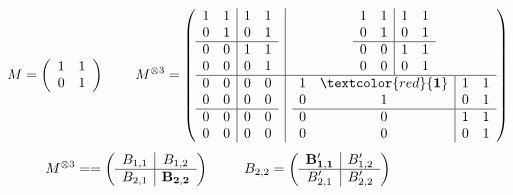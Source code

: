 \documentclass[11pt]{article}
\begin{document}
{{\begin{figure}[htb!]
\centering
$$
M =
\left(
\begin{array}{cc}
1 & 1 \\
0 & 1 \\
\end{array}
\right)
\;\;\;\;\;\;\;\;
M^{\otimes 3} =
\left(
\begin{array}{@{}c|c@{}}
\begin{array}{cc|cc}
    1 & 1 & 1 & 1 \\
    0 & 1 & 0 & 1  \\\hline
    0 & 0 & 1 & 1  \\
    0 & 0 & 0 & 1  \\
\end{array}
&
\begin{array}{cc|cc}
     1 & 1 &  1 & 1\\
     0 & 1 &  0 & 1 \\\hline
      0 & 0 &  1 & 1 \\
     0 & 0 &  0 & 1 \\
\end{array}\\\hline
\begin{array}{cc|cc}
    0 & 0 & 0 & 0  \\
    0 & 0 & 0 & 0  \\\hline
    0 & 0 & 0 & 0  \\
    0 & 0 & 0 & 0  \\
\end{array}
&
\begin{array}{cc|cc}
  1 & \textcolor{red}{\bf 1} &  1 & 1 \\
  0 & 1 &  0 & 1 \\\hline
  0 & 0 &  1 & 1 \\
 0 & 0 &  0 & 1 \\
    \end{array}
\end{array}
\right)
$$
\vspace{2em}
\begingroup
   \renewcommand{\arraystretch}{1.6}
$$
M^{\otimes 3} = = \left(\begin{array}{c|c}
  B_{1,1}  &   B_{1,2}\\
\hline
 B_{2,1}  &  {\bf B_{2,2}}
\end{array}\right)
\;\;\;\;\;\;\;\;\;
B_{2,2} = \left(
\begin{array}{c|c}
  {\bf  B'_{1,1}} & B'_{1,2} \\\hline
  B'_{2,1} & B'_{2,2}
  \end{array}\right)
$$
\end{figure}}}
\end{document}
